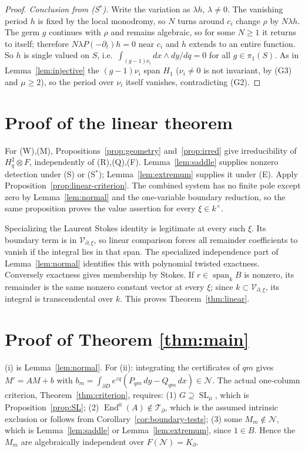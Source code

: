 \documentclass[11pt]{article}
\numberwithin{equation}{section}
\theoremstyle{definition}
\theoremstyle{remark}
\newcommand{\Span}{\operatorname{span}}
\newcommand{\End}{\operatorname{End}}
\newcommand{\SL}{\operatorname{SL}}
\newcommand{\Vcal}{\mathcal V}
\newcommand{\Hq}{H_q^2}
\newcommand{\Ncal}{\mathcal N}
\newcommand{\Tcal}{\mathcal T}
\begin{document}
\begin{proof}
\emph{Conclusion from (S$^*$).} Write the variation as $\lambda h$, $\lambda\ne0$. The
vanishing period $h$ is fixed by the local monodromy, so $N$ turns around
$c_i$ change $\rho$ by $N\lambda h$. The germ $g$ continues with $\rho$ and
remains algebraic, so for some $N\ge1$ it returns to itself; therefore
$N\lambda P(-\partial_t)h=0$ near $c_i$ and $h$ extends to an entire function. So $h$ is
single valued on $S$, i.e.\ $\int_{(g-1)\nu_i}dx\wedge dy/dq=0$ for all
$g\in\pi_1(S)$. As in Lemma~\ref{lem:injective} the $(g-1)\nu_i$ span $H_1$
($\nu_i\ne0$ is not invariant, by (G3) and $\mu\ge2$), so the period over $\nu_i$
itself vanishes, contradicting (G2).
\end{proof}

\section{Proof of the linear theorem}

For (W),(M), Propositions~\ref{prop:geometry} and~\ref{prop:irred} give
irreducibility of $\Hq\otimes F$, independently of (R),(Q),(F).
Lemma~\ref{lem:saddle} supplies nonzero detection under (S) or (S$^*$);
Lemma~\ref{lem:extremum} supplies it under (E). Apply
Proposition~\ref{prop:linear-criterion}. The combined system has no finite
pole except zero by Lemma~\ref{lem:normal} and the one-variable boundary
reduction, so the same proposition proves the value assertion for every
$\xi\in k^\times$.

Specializing the Laurent Stokes identity is legitimate at every such $\xi$.
Its boundary term is in $\Vcal_{\partial,\xi}$, so linear comparison forces
all remainder coefficients to vanish if the integral lies in that span.
The specialized independence part of Lemma~\ref{lem:normal} identifies this
with polynomial twisted exactness. Conversely exactness gives membership
by Stokes. If $r\in\Span_k B$ is nonzero, its remainder is the same nonzero
constant vector at every $\xi$; since $k\subset\Vcal_{\partial,\xi}$, its
integral is transcendental over $k$. This proves Theorem~\ref{thm:linear}.

\section{Proof of Theorem \ref{thm:main}}

(i) is Lemma~\ref{lem:normal}. For (ii): integrating the certificates of
$qm$ gives $M'=AM+b$ with $b_m=\int_{\partial D}e^{zq}(P_{qm}\,dy-Q_{qm}\,dx)\in\Ncal$.
The actual one-column criterion, Theorem~\ref{thm:criterion}, requires:
(1) $G\supseteq\SL_\mu$, which is Proposition~\ref{prop:SL};
(2) $\End^0(A)\notin\Tcal_\partial$, which is the assumed intrinsic
exclusion or follows from Corollary~\ref{cor:boundary-tests};
(3) some $M_m\notin\Ncal$, which is Lemma~\ref{lem:saddle} or
Lemma~\ref{lem:extremum}, since $1\in B$.
Hence the $M_m$ are algebraically independent over $F(\Ncal)=K_\partial$.
\end{document}
